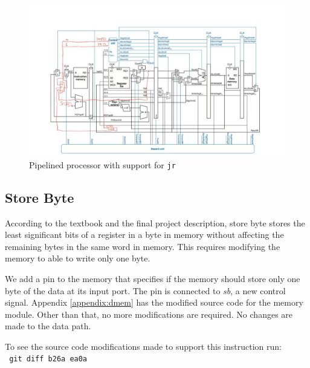 \documentclass[titlepage,12pt,oneside,a4paper]{article}
\newcommand{\code}[1]{{\texttt{#1}}}
\begin{document}
\begin{figure}
	\includegraphics[width=\textwidth]{jr.jpeg}
	\centering
	\caption{Pipelined processor with support for \code{jr}}
	\label{fig:jr}
\end{figure}

\subsection{Store Byte}
According to the textbook and the final project description, store byte stores the least significant bits of a register in a byte in memory without affecting the remaining bytes in the same word in memory. This requires modifying the memory to able to write only one byte.

We add a pin to the memory that specifies if the memory should store only one byte of the data at its input port. The pin is connected to \textit{sb}, a new control signal. Appendix \ref{appendix:dmem} has the modified source code for the memory module. Other than that, no more modifications are required. No changes are made to the data path.

To see the source code modifications made to support this instruction run:\\
\code{ git diff b26a ea0a}
\end{document}
